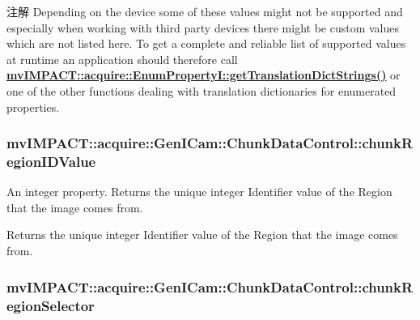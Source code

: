 \begin{DoxyNote}{注解}
Depending on the device some of these values might not be supported and especially when working with third party devices there might be custom values which are not listed here. To get a complete and reliable list of supported values at runtime an application should therefore call {\bfseries \hyperlink{classmv_i_m_p_a_c_t_1_1acquire_1_1_enum_property_i_a0ba6ccbf5ee69784d5d0b537924d26b6}{mv\+I\+M\+P\+A\+C\+T\+::acquire\+::\+Enum\+Property\+I\+::get\+Translation\+Dict\+Strings()}} or one of the other functions dealing with translation dictionaries for enumerated properties. 
\end{DoxyNote}
\hypertarget{classmv_i_m_p_a_c_t_1_1acquire_1_1_gen_i_cam_1_1_chunk_data_control_a4bfe87b51e018b8e2b0b869950ffde7c}{
\subsubsection[{chunk\+Region\+I\+D\+Value}]{ mv\+I\+M\+P\+A\+C\+T\+::acquire\+::\+Gen\+I\+Cam\+::\+Chunk\+Data\+Control\+::chunk\+Region\+I\+D\+Value}}\label{classmv_i_m_p_a_c_t_1_1acquire_1_1_gen_i_cam_1_1_chunk_data_control_a4bfe87b51e018b8e2b0b869950ffde7c}


An integer property. Returns the unique integer Identifier value of the Region that the image comes from. 

Returns the unique integer Identifier value of the Region that the image comes from. \hypertarget{classmv_i_m_p_a_c_t_1_1acquire_1_1_gen_i_cam_1_1_chunk_data_control_a44981b8369742dda80bf40a15190c93a}{
\subsubsection[{chunk\+Region\+Selector}]{ mv\+I\+M\+P\+A\+C\+T\+::acquire\+::\+Gen\+I\+Cam\+::\+Chunk\+Data\+Control\+::chunk\+Region\+Selector}}\label{classmv_i_m_p_a_c_t_1_1acquire_1_1_gen_i_cam_1_1_chunk_data_control_a44981b8369742dda80bf40a15190c93a}


